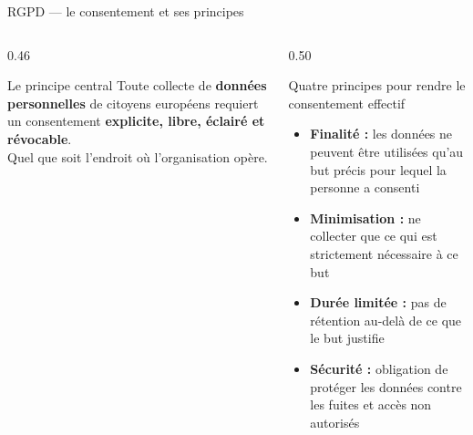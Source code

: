 \documentclass[aspectratio=169, 10pt]{beamer}
\begin{document}
\begin{frame}{RGPD --- le consentement et ses principes}
  \begin{columns}[T]
    \begin{column}{0.46\textwidth}
      \begin{alertblock}{Le principe central}
        Toute collecte de \textbf{données personnelles}
        de citoyens européens requiert un consentement
        \textbf{explicite, libre, éclairé et révocable}.\\[2pt]
        \small Quel que soit l'endroit où l'organisation opère.
      \end{alertblock}
      \vspace{4pt}
      \begin{center}
      \end{center}
    \end{column}
    \begin{column}{0.50\textwidth}
      \begin{block}{Quatre principes pour rendre le consentement effectif}
        \begin{itemize}
          \item \textbf{Finalité :} les données ne peuvent être utilisées
                qu'au but précis pour lequel la personne a consenti
          \item \textbf{Minimisation :} ne collecter que ce qui est
                strictement nécessaire à ce but
          \item \textbf{Durée limitée :} pas de rétention au-delà
                de ce que le but justifie
          \item \textbf{Sécurité :} obligation de protéger les données
                contre les fuites et accès non autorisés
        \end{itemize}
      \end{block}
    \end{column}
  \end{columns}
\end{frame}
\end{document}
